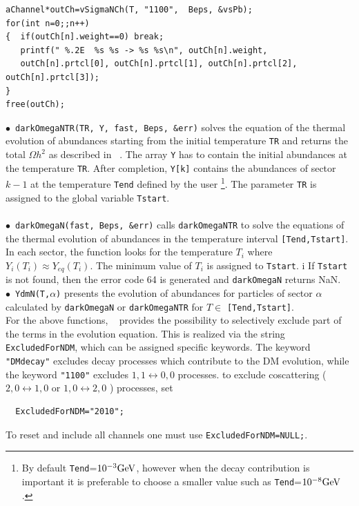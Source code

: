 \documentclass[12pt,a4paper]{article}
\begin{document}
\begin{verbatim}
aChannel*outCh=vSigmaNCh(T, "1100",  Beps, &vsPb);
for(int n=0;;n++)
{  if(outCh[n].weight==0) break;
   printf(" %.2E  %s %s -> %s %s\n", outCh[n].weight, 
   outCh[n].prtcl[0], outCh[n].prtcl[1], outCh[n].prtcl[2], outCh[n].prtcl[3]);
}
free(outCh);
\end{verbatim}
 
 \noindent
$\bullet$~\verb|darkOmegaNTR(TR, Y, fast, Beps, &err)|  solves the equation of the thermal evolution of abundances
starting from the initial temperature {\tt TR} and returns the total $\Omega h^2$ as described in ~\cite{Alguero:2022inz}. The array {\tt Y} has to contain the initial abundances at the temperature
{\tt TR}. After completion, {\tt Y[k]} contains the abundances of sector $k-1$ at the temperature {\tt Tend} defined by the
user \footnote{By default {\tt Tend}=$10^{-3} {\rm GeV}$, however when the decay contribution is important it is preferable to choose a smaller value such as {\tt Tend}=$10^{-8} {\rm GeV}$ .}. The parameter {\tt TR} is assigned to the global variable {\tt Tstart}. \\
%
\\
$\bullet$~\verb|darkOmegaN(fast, Beps, &err)|  calls \verb|darkOmegaNTR| to solve the equations of the thermal evolution of abundances in the temperature interval \verb|[Tend,Tstart]|.
In each sector, the function looks for the temperature $T_i$ where $Y_i(T_i)\approx Y_{eq}(T_i)$. The minimum value of $T_i$ is assigned to {\tt Tstart}.  i If {\tt Tstart} is not found, then the 
error code 64 is generated and {\tt darkOmegaN} returns NaN. 
\\
$\bullet$~\verb|YdmN(T,|$\alpha${\tt)}  presents  the evolution of abundances  for particles of sector $\alpha$ calculated by
\verb|darkOmegaN| or \verb|darkOmegaNTR|  for  $ T \in $ {\tt [Tend,Tstart]}.\\

For the above functions, \micro~ provides the possibility to selectively exclude part of the terms in the evolution equation. 
This is realized via the string 
{\tt ExcludedForNDM}, which can be assigned specific keywords. The keyword \verb|"DMdecay"| excludes decay processes 
which contribute to the DM evolution, while the keyword  \verb|"1100"| excludes $1,1 \leftrightarrow 0,0$ processes. 
to exclude coscattering ($2,0 \leftrightarrow 1,0$ or $1,0 \leftrightarrow 2,0$ ) processes, set 
\begin{verbatim}
  ExcludedForNDM="2010";
\end{verbatim}
To reset and include all channels one must use    {\tt ExcludedForNDM=NULL;}. \\
                       
\end{document}
